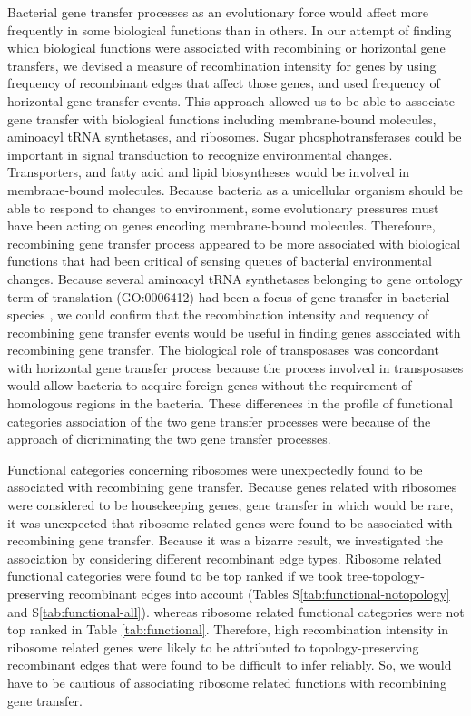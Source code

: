 \documentclass[10pt]{article}
\let\citep\cite
\begin{document}
Bacterial gene transfer processes as an evolutionary force would affect more
frequently in some biological functions than in others.  In our attempt of
finding which biological functions were associated with recombining or
horizontal gene transfers, we devised a measure of recombination intensity for
genes by using frequency of recombinant edges that affect those genes, and used
frequency of horizontal gene transfer events.  This approach allowed us to be
able to associate gene transfer with biological functions including
membrane-bound molecules, aminoacyl tRNA synthetases, and ribosomes.  Sugar
phosphotransferases could be important in signal transduction to recognize
environmental changes.  Transporters, and fatty acid and lipid biosyntheses
would be involved in membrane-bound molecules.  Because bacteria as a
unicellular organism should be able to respond to changes to environment, some
evolutionary pressures must have been acting on genes encoding membrane-bound
molecules. Therefoure, recombining gene transfer process appeared to be more
associated with biological functions that had been critical of sensing queues of
bacterial environmental changes.  Because several aminoacyl tRNA synthetases
belonging to gene ontology term of translation (GO:0006412) had been a focus of
gene transfer in bacterial species \citep{Woese2000}, we could confirm that the
recombination intensity and requency of recombining gene transfer events would
be useful in finding genes associated with recombining gene transfer.
The biological role of transposases was concordant with horizontal gene transfer
process because the process involved in transposases would allow bacteria to
acquire foreign genes without the requirement of homologous regions in the
bacteria.  These differences in the profile of functional categories association
of the two gene transfer processes were because of the approach of dicriminating
the two gene transfer processes.

Functional categories concerning ribosomes were unexpectedly found to be
associated with recombining gene transfer.  Because genes related with ribosomes
were considered to be housekeeping genes, gene transfer in which would be rare,
it was unexpected that ribosome related genes were found to be associated with
recombining gene transfer.  Because it was a bizarre result, we investigated the
association by considering different recombinant edge types.  Ribosome related
functional categories were found to be top ranked if we took
tree-topology-preserving recombinant edges into account (Tables
S\ref{tab:functional-notopology} and S\ref{tab:functional-all}).  whereas
ribosome related functional categories were not top ranked in Table
\ref{tab:functional}.  Therefore, high recombination intensity in ribosome
related genes were likely to be attributed to topology-preserving recombinant
edges that were found to be difficult to infer reliably. So, we would have to be
cautious of associating ribosome related functions with recombining gene
transfer.
\end{document}
